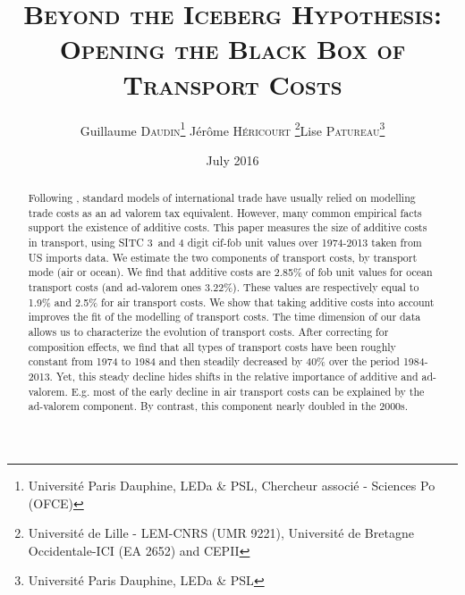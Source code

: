 \documentclass[a4paper,11pt]{article}
\begin{document}
\title{\textsc{Beyond the Iceberg Hypothesis: \\Opening the Black Box of Transport Costs}} %
\author{Guillaume \textsc{Daudin}\thanks{%
Universit\'{e} Paris Dauphine, LEDa \& PSL, Chercheur associ\'{e} - Sciences Po (OFCE)}  \qquad J\'{e}r\^{o}me \textsc{H\'{e}ricourt} \thanks{Universit\'{e} de Lille - LEM-CNRS (UMR 9221), Universit\'{e} de Bretagne Occidentale-ICI (EA 2652) and CEPII}\qquad Lise \textsc{Patureau}\thanks{Universit\'{e} Paris Dauphine, LEDa \& PSL} }
 \maketitle

\date{July 2016}
\bigskip

\begin{abstract}
Following \cite{samuelson1954}, standard models of international trade have usually relied on modelling trade costs as an ad valorem tax equivalent. However, many common empirical facts support the existence of additive costs. This paper measures the size of additive costs in transport, using SITC 3 and 4 digit cif-fob unit values over 1974-2013 taken from US imports data. We estimate the two components of transport costs, by transport mode (air or ocean). We find that additive costs are 2.85\% of fob unit values for ocean transport costs (and ad-valorem ones 3.22\%).  These values are respectively equal to 1.9\% and 2.5\% for air transport costs. We show that taking additive costs into account improves the fit of the modelling of transport costs. The time dimension of our data allows us to characterize the evolution of transport costs. After correcting for composition effects, we find that all types of transport costs have been roughly constant from 1974 to 1984 and then steadily decreased by 40\% over the period 1984-2013. Yet, this steady decline hides shifts in the relative importance of additive and ad-valorem. E.g. most of the early decline in air transport costs can be explained by the ad-valorem component. By contrast, this component nearly doubled in the 2000s. 
\end{abstract}
\end{document}

